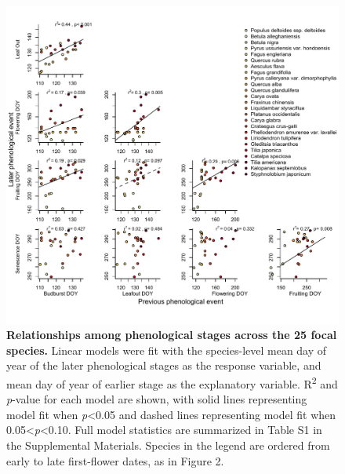 \documentclass{article}
\begin{document}
  \begin{figure}[h]
  \centering
  \includegraphics{../analyses/figures/latevearly_rp_col_legend_ROY_ripefruit.pdf}
  
  \caption{\textbf{Relationships among phenological stages across the 25 focal species.} Linear models were fit with the species-level mean day of year of the later phenological stages as the response variable, and mean day of year of earlier stage as the explanatory variable. R\textsuperscript{2} and \textit{p}-value for each model are shown, with solid lines representing model fit when \textit{p}<0.05 and dashed lines representing model fit when 0.05<\textit{p}<0.10. Full model statistics are summarized in Table S1 in the Supplemental Materials. Species in the legend are ordered from early to late first-flower dates, as in Figure 2.} %
  \label{fig:latevearly}
\end{figure}
\end{document}
